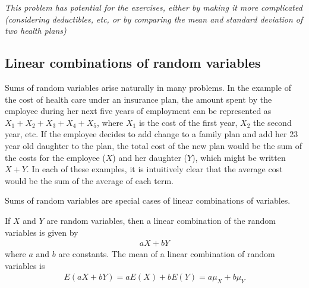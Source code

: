 \begin{doublespace}
\textit{This problem has potential for the exercises, either by making it more complicated (considering deductibles, etc, or by comparing the mean and standard deviation of two health plans)}

\subsection{Linear combinations of random variables}

Sums of random variables arise naturally in many problems.  In the example of the cost of  health care under an insurance plan, the amount spent by the employee during her next five years of employment can be represented as $X_1 + X_2 + X_3 + X_4 + X_5$, where $X_1$ is the cost of the first year, $X_2$ the second year, etc. If the employee decides to add change to a family plan and add her 23 year old daughter to the plan, the total cost of the new plan would be the sum of the costs for the employee ($X$) and her daughter ($Y$), which might be written $X + Y$.  In each of these examples, it is intuitively clear that the average cost would be the sum of the average of each term.

Sums of random variables are special cases of linear combinations of variables.  

\begin{termBox}{
If $X$ and $Y$ are random variables, then a linear combination of the random variables is given by
\begin{align}\label{linComboOfRandomVariablesXAndY}
aX + bY
\end{align}
where $a$ and $b$ are constants.  The mean of a linear combination of random variables is 
\begin{align*}
 E(aX + bY) = aE(X) + bE(Y) = a\mu_X + b\mu_Y
\end{align*}}
\end{termBox}


\end{doublespace}